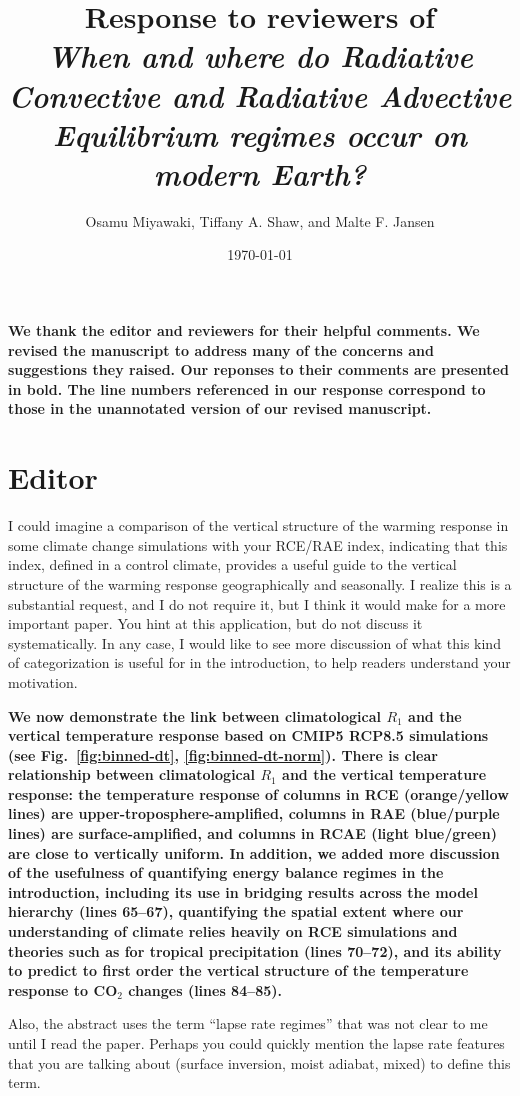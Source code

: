 \documentclass{article}
\title{Response to reviewers of \\ \textit{When and where do Radiative Convective and Radiative Advective Equilibrium regimes occur on modern Earth?}}
\date{\today}
\author{Osamu Miyawaki, Tiffany A. Shaw, and Malte F. Jansen}
\begin{document}
\maketitle

\textbf{We thank the editor and reviewers for their helpful comments. We revised the manuscript to address many of the concerns and suggestions they raised. Our reponses to their comments are presented in bold. The line numbers referenced in our response correspond to those in the unannotated version of our revised manuscript.}

\section*{Editor}
I could imagine a comparison of the vertical structure of the warming response in some climate change simulations with your RCE/RAE index, indicating that this index, defined in a control climate, provides a useful guide to the vertical structure of the warming response geographically and seasonally.  I realize this is a substantial request, and I do not require it, but I think it would make for a more important paper.  You hint at this application, but do not discuss it systematically.  In any case, I would like to see more discussion of what this kind of categorization is useful for in the introduction, to help readers understand your motivation. 

\textbf{We now demonstrate the link between climatological $R_1$ and the vertical temperature response based on CMIP5 RCP8.5 simulations (see Fig.~\ref{fig:binned-dt}, \ref{fig:binned-dt-norm}). There is clear relationship between climatological $R_1$ and the vertical temperature response: the temperature response of columns in RCE (orange/yellow lines) are upper-troposphere-amplified, columns in RAE (blue/purple lines) are surface-amplified, and columns in RCAE (light blue/green) are close to vertically uniform. In addition, we added more discussion of the usefulness of quantifying energy balance regimes in the introduction, including its use in bridging results across the model hierarchy (lines 65--67), quantifying the spatial extent where our understanding of climate relies heavily on RCE simulations and theories such as for tropical precipitation (lines 70--72), and its ability to predict to first order the vertical structure of the temperature response to CO$_2$ changes (lines 84--85). }

Also, the abstract uses the term “lapse rate regimes” that was not clear to me until I read the paper.  Perhaps you could quickly mention the lapse rate features that you are talking about (surface inversion, moist adiabat, mixed) to define this term.
\end{document}
